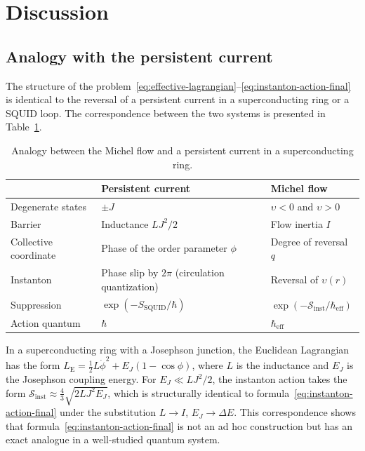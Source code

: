 \documentclass[12pt,a4paper,preprint]{elsarticle}
\begin{document}
    \section{Discussion}\label{sec:discussion}
        \subsection{Analogy with the persistent current}\label{subsec:persistent-current}
            The structure of the problem~\eqref{eq:effective-lagrangian}--\eqref{eq:instanton-action-final} is identical to the reversal of a persistent current in a superconducting ring or a SQUID loop. The correspondence between the two systems is presented in Table~\ref{tab:analogy}.
            \begin{table}[htb]
                \centering
                \caption{Analogy between the Michel flow and a persistent current in a superconducting ring.}
                \label{tab:analogy}
                \small
                \begin{tabular}{lll}
                    \toprule
                    & Persistent current & Michel flow \\
                    \midrule
                    Degenerate states & $\pm J$ & $\upsilon < 0$ and $\upsilon > 0$ \\
                    Barrier & Inductance $LJ^{2}/2$ & Flow inertia $I$ \\
                    Collective coordinate & Phase of the order parameter $\phi$ & Degree of reversal $q$ \\
                    Instanton & Phase slip by $2\pi$ (circulation quantization) & Reversal of $\upsilon(r)$ \\
                    Suppression & $\exp(-S_{\mathrm{SQUID}}/\hbar)$ & $\exp(-\mathcal{S}_{\mathrm{inst}}/\hbar_{\mathrm{eff}})$ \\
                    Action quantum & $\hbar$ & $\hbar_{\mathrm{eff}}$ \\
                    \bottomrule
                \end{tabular}
            \end{table}
            In a superconducting ring with a Josephson junction, the Euclidean Lagrangian has the form $L_{\mathrm{E}} = \frac{1}{2}L\dot{\phi}^{2} + E_{J}(1 - \cos\phi)$, where $L$ is the inductance and $E_{J}$ is the Josephson coupling energy. For $E_{J} \ll LJ^{2}/2$, the instanton action takes the form $\mathcal{S}_{\mathrm{inst}} \approx \frac{4}{3}\sqrt{2LJ^{2}E_{J}}$, which is structurally identical to formula~\eqref{eq:instanton-action-final} under the substitution $L \to I$, $E_{J} \to \Delta E$. This correspondence shows that formula~\eqref{eq:instanton-action-final} is not an ad hoc construction but has an exact analogue in a well-studied quantum system.
            
\end{document}
